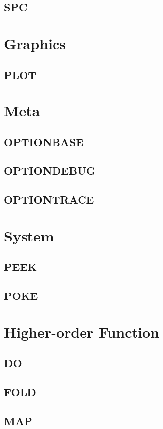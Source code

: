     \subsection{SPC}

\section{Graphics}

    \subsection{PLOT}

\section{Meta}

    \subsection{OPTIONBASE}
    \subsection{OPTIONDEBUG}
    \subsection{OPTIONTRACE}

\section{System}

    \subsection{PEEK}
    \subsection{POKE}

\section{Higher-order Function}

    \subsection{DO}
    \subsection{FOLD}
    \subsection{MAP}
